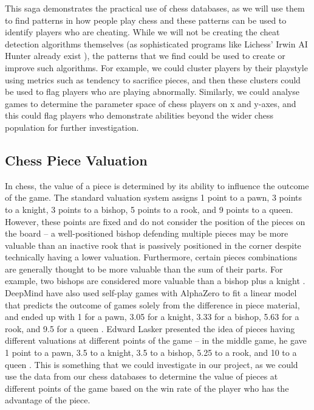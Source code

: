 \documentclass[%
 superscriptaddress,
showpacs,preprintnumbers,
 amsmath,
 amssymb,
 aps,
 pra,
showkeys,
onecolumn,
notitlepage,
11pt,
tightenlines      %
]{revtex4-1}
\begin{document}
This saga demonstrates the practical use of chess databases, as we will use them to find patterns in how people play chess and these patterns can be used to identify players who are cheating. While we will not be creating the cheat detection algorithms themselves (as sophisticated programs like Lichess' Irwin AI Hunter already exist \cite{lichessIrwinCheatDetection}), the patterns that we find could be used to create or improve such algorithms. For example, we could cluster players by their playstyle using metrics such as tendency to sacrifice pieces, and then these clusters could be used to flag players who are playing abnormally. Similarly, we could analyse games to determine the parameter space of chess players on x and y-axes, and this could flag players who demonstrate abilities beyond the wider chess population for further investigation.

\subsection{Chess Piece Valuation}
In chess, the value of a piece is determined by its ability to influence the outcome of the game. The standard valuation system assigns 1 point to a pawn, 3 points to a knight, 3 points to a bishop, 5 points to a rook, and 9 points to a queen. However, these points are fixed and do not consider the position of the pieces on the board -- a well-positioned bishop defending multiple pieces may be more valuable than an inactive rook that is passively positioned in the corner despite technically having a lower valuation. Furthermore, certain pieces combinations are generally thought to be more valuable than the sum of their parts. For example, two bishops are considered more valuable than a bishop plus a knight \cite{timoshchenko1993bishop}. DeepMind have also used self-play games with AlphaZero to fit a linear model that predicts the outcome of games solely from the difference in piece material, and ended up with 1 for a pawn, 3.05 for a knight, 3.33 for a bishop, 5.63 for a rook, and 9.5 for a queen \cite{tomavsev2020assessing}. Edward Lasker presented the idea of pieces having different valuations at different points of the game -- in the middle game, he gave 1 point to a pawn, 3.5 to a knight, 3.5 to a bishop, 5.25 to a rook, and 10 to a queen \cite{lasker2021chess}. This is something that we could investigate in our project, as we could use the data from our chess databases to determine the value of pieces at different points of the game based on the win rate of the player who has the advantage of the piece.
\end{document}
